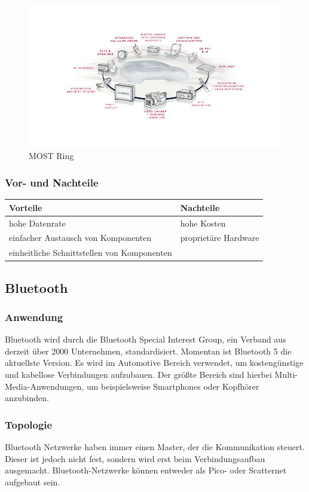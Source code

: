 \begin{figure}[h!]
	\includegraphics[width=\linewidth]{most-ring.jpg}
	\caption[https://images.tecchannel.de/bdb/361603/840x473.jpg]{MOST Ring}
\end{figure}

\subsubsection{Vor- und Nachteile}
\begin{tabular}{l|l}
	\textbf{Vorteile} & \textbf{Nachteile}\\
	\hline hohe Datenrate & hohe Kosten\\
	\hline einfacher Austausch von Komponenten & proprietäre Hardware\\
	\hline einheitliche Schnittstellen von Komponenten &\\
\end{tabular}

\subsection{Bluetooth}		
\subsubsection{Anwendung}
Bluetooth wird durch die Bluetooth Special Interest Group, ein Verband aus derzeit über 2000 Unternehmen,  standardisiert. Momentan ist Bluetooth 5 die aktuellste Version. Es wird im Automotive Bereich verwendet, um kostengünstige und kabellose Verbindungen aufzubauen. Der größte Bereich sind hierbei Multi-Media-Anwendungen, um beispielsweise Smartphones oder Kopfhörer anzubinden. \cite{BP01}

\subsubsection{Topologie}
Bluetooth Netzwerke haben immer einen Master, der die Kommunikation steuert. Dieser ist jedoch nicht fest, sondern wird erst beim Verbindungsaufbau ausgemacht.
Bluetooth-Netzwerke können entweder als Pico- oder Scatternet aufgebaut sein.
                                                                                  
